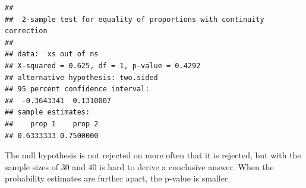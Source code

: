 \documentclass[
]{article}
\begin{document}
\begin{verbatim}
## 
##  2-sample test for equality of proportions with continuity correction
## 
## data:  xs out of ns
## X-squared = 0.625, df = 1, p-value = 0.4292
## alternative hypothesis: two.sided
## 95 percent confidence interval:
##  -0.3643341  0.1310007
## sample estimates:
##    prop 1    prop 2 
## 0.6333333 0.7500000
\end{verbatim}

The null hypothesis is not rejected on more often that it is rejected,
but with the sample sizes of 30 and 40 is hard to derive a conclusive
answer. When the probability estimates are further apart, the p-value is
smaller.
\end{document}
